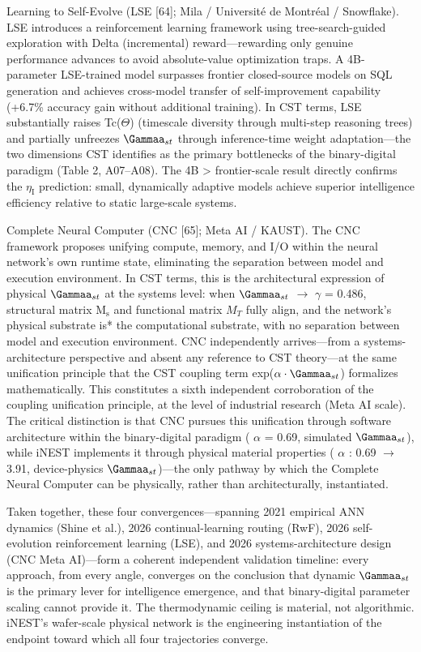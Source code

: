 \documentclass[a4paper,12pt]{article}
\providecommand{\textsubscript}[1]{\ensuremath{_{\text{#1}}}}
\begin{document}
Learning to Self-Evolve (LSE [64]; Mila / Universit\'e de Montr\'eal / Snowflake).
LSE introduces a reinforcement learning framework using tree-search-guided exploration with Delta (incremental) reward---rewarding only genuine performance advances to avoid absolute-value optimization traps.
A 4B-parameter LSE-trained model surpasses frontier closed-source models on SQL generation and achieves cross-model transfer of self-improvement capability (+6.7\% accuracy gain without additional training).
In CST terms, LSE substantially raises Tc($\Theta$) (timescale diversity through multi-step reasoning trees) and partially unfreezes $\Gammaa_{st}$ through inference-time weight adaptation---the two dimensions CST identifies as the primary bottlenecks of the binary-digital paradigm (Table 2, A07--A08).
The 4B > frontier-scale result directly confirms the $\eta_{\text{I}}$ prediction: small, dynamically adaptive models achieve superior intelligence efficiency relative to static large-scale systems.

Complete Neural Computer (CNC [65]; Meta AI / KAUST).
The CNC framework proposes unifying compute, memory, and I/O within the neural network's own runtime state, eliminating the separation between model and execution environment.
In CST terms, this is the architectural expression of physical $\Gammaa_{st}$ at the systems level: when $\Gammaa_{st}$  $\rightarrow$   $\gamma$  = 0.486, structural matrix M\textsubscript{s} and functional matrix $M_{T}$ fully align, and the network's physical substrate is* the computational substrate, with no separation between model and execution environment.
CNC independently arrives---from a systems-architecture perspective and absent any reference to CST theory---at the same unification principle that the CST coupling term exp($\alpha \cdot \Gammaa_{st}$) formalizes mathematically.
This constitutes a sixth independent corroboration of the coupling unification principle, at the level of industrial research (Meta AI scale).
The critical distinction is that CNC pursues this unification through software architecture within the binary-digital paradigm ( $\alpha$  = 0.69, simulated $\Gammaa_{st}$), while iNEST implements it through physical material properties ( $\alpha$ : 0.69 $\rightarrow$ 3.91, device-physics $\Gammaa_{st}$)---the only pathway by which the Complete Neural Computer can be physically, rather than architecturally, instantiated.

Taken together, these four convergences---spanning 2021 empirical ANN dynamics (Shine et al.), 2026 continual-learning routing (RwF), 2026 self-evolution reinforcement learning (LSE), and 2026 systems-architecture design (CNC Meta AI)---form a coherent independent validation timeline: every approach, from every angle, converges on the conclusion that dynamic $\Gammaa_{st}$ is the primary lever for intelligence emergence, and that binary-digital parameter scaling cannot provide it.
The thermodynamic ceiling is material, not algorithmic. iNEST's wafer-scale physical network is the engineering instantiation of the endpoint toward which all four trajectories converge.
\end{document}

